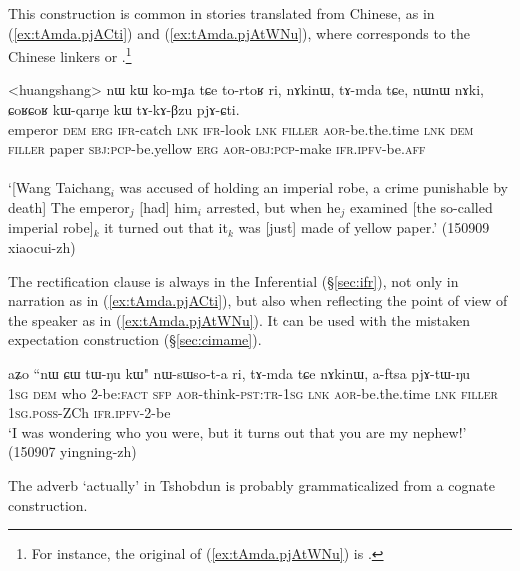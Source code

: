This construction is common in stories translated from Chinese, as in (\ref{ex:tAmda.pjACti}) and (\ref{ex:tAmda.pjAtWNu}), where  corresponds to the Chinese linkers  or  .\footnote{For instance, the original of (\ref{ex:tAmda.pjAtWNu}) is . }  

\begin{exe}
\ex \label{ex:tAmda.pjACti}
\gll <huangshang> nɯ kɯ ko-mɟa tɕe to-rtoʁ ri, nɤkinɯ, tɤ-mda tɕe,  nɯnɯ nɤki, ɕoʁɕoʁ kɯ-qarŋe kɯ tɤ-kɤ-βzu pjɤ-ɕti. \\
emperor \textsc{dem} \textsc{erg} \textsc{ifr}-catch \textsc{lnk} \textsc{ifr}-look \textsc{lnk} \textsc{filler} \textsc{aor}-be.the.time \textsc{lnk} \textsc{dem} \textsc{filler} paper \textsc{sbj}:\textsc{pcp}-be.yellow \textsc{erg} \textsc{aor}-\textsc{obj}:\textsc{pcp}-make \textsc{ifr}.\textsc{ipfv}-be.\textsc{aff} \\
\\
\glt `[Wang Taichang$_i$ was accused of holding an imperial robe, a crime punishable by death] The emperor$_j$ [had] him$_i$ arrested, but when he$_j$ examined [the so-called imperial robe]$_k$ it turned out that it$_k$ was [just] made of yellow paper.' (150909 xiaocui-zh)
\end{exe} 
 
 The rectification clause is always in the Inferential (§\ref{sec:ifr}), not only in narration as in (\ref{ex:tAmda.pjACti}), but also when reflecting the point of view of the speaker as in (\ref{ex:tAmda.pjAtWNu}). It can be used with the mistaken expectation construction (§\ref{sec:cimame}).
 
\begin{exe}
\ex \label{ex:tAmda.pjAtWNu}
\gll  aʑo ``nɯ ɕɯ tɯ-ŋu kɯ" nɯ-sɯso-t-a ri,  tɤ-mda tɕe nɤkinɯ, a-ftsa pjɤ-tɯ-ŋu  \\
\textsc{1sg} \textsc{dem} who 2-be:\textsc{fact} \textsc{sfp} \textsc{aor}-think-\textsc{pst}:\textsc{tr}-\textsc{1sg} \textsc{lnk} \textsc{aor}-be.the.time \textsc{lnk} \textsc{filler} \textsc{1sg}.\textsc{poss}-ZCh \textsc{ifr}.\textsc{ipfv}-2-be \\
\glt `I was wondering who you were, but it turns out that you are my nephew!' (150907 yingning-zh)
\end{exe} 

The adverb  `actually' in Tshobdun \citep[44;802]{jackson19tshobdun} is probably grammaticalized from a cognate construction.

